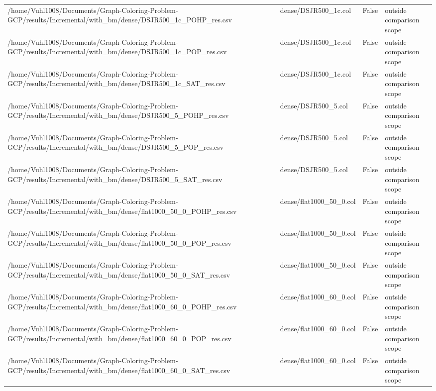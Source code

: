 \begin{table}[htbp]
\begin{tabular}{llll}
/home/Vuhl1008/Documents/Graph-Coloring-Problem-GCP/results/Incremental/with\_bm/dense/DSJR500\_1c\_POHP\_res.csv & dense/DSJR500\_1c.col & False & outside comparison scope \\
/home/Vuhl1008/Documents/Graph-Coloring-Problem-GCP/results/Incremental/with\_bm/dense/DSJR500\_1c\_POP\_res.csv & dense/DSJR500\_1c.col & False & outside comparison scope \\
/home/Vuhl1008/Documents/Graph-Coloring-Problem-GCP/results/Incremental/with\_bm/dense/DSJR500\_1c\_SAT\_res.csv & dense/DSJR500\_1c.col & False & outside comparison scope \\
/home/Vuhl1008/Documents/Graph-Coloring-Problem-GCP/results/Incremental/with\_bm/dense/DSJR500\_5\_POHP\_res.csv & dense/DSJR500\_5.col & False & outside comparison scope \\
/home/Vuhl1008/Documents/Graph-Coloring-Problem-GCP/results/Incremental/with\_bm/dense/DSJR500\_5\_POP\_res.csv & dense/DSJR500\_5.col & False & outside comparison scope \\
/home/Vuhl1008/Documents/Graph-Coloring-Problem-GCP/results/Incremental/with\_bm/dense/DSJR500\_5\_SAT\_res.csv & dense/DSJR500\_5.col & False & outside comparison scope \\
/home/Vuhl1008/Documents/Graph-Coloring-Problem-GCP/results/Incremental/with\_bm/dense/flat1000\_50\_0\_POHP\_res.csv & dense/flat1000\_50\_0.col & False & outside comparison scope \\
/home/Vuhl1008/Documents/Graph-Coloring-Problem-GCP/results/Incremental/with\_bm/dense/flat1000\_50\_0\_POP\_res.csv & dense/flat1000\_50\_0.col & False & outside comparison scope \\
/home/Vuhl1008/Documents/Graph-Coloring-Problem-GCP/results/Incremental/with\_bm/dense/flat1000\_50\_0\_SAT\_res.csv & dense/flat1000\_50\_0.col & False & outside comparison scope \\
/home/Vuhl1008/Documents/Graph-Coloring-Problem-GCP/results/Incremental/with\_bm/dense/flat1000\_60\_0\_POHP\_res.csv & dense/flat1000\_60\_0.col & False & outside comparison scope \\
/home/Vuhl1008/Documents/Graph-Coloring-Problem-GCP/results/Incremental/with\_bm/dense/flat1000\_60\_0\_POP\_res.csv & dense/flat1000\_60\_0.col & False & outside comparison scope \\
/home/Vuhl1008/Documents/Graph-Coloring-Problem-GCP/results/Incremental/with\_bm/dense/flat1000\_60\_0\_SAT\_res.csv & dense/flat1000\_60\_0.col & False & outside comparison scope \\

\end{tabular}
\end{table}
